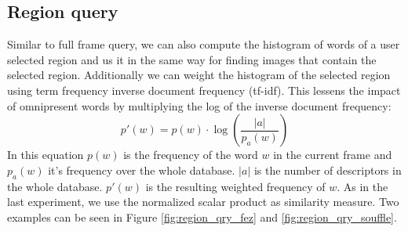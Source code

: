 \documentclass{paper}
\begin{document}
\subsection{Region query}
Similar to full frame query, we can also compute the histogram of words of a user 
selected region and us it in the same way for finding images that contain the 
selected region. Additionally we can weight the histogram of the selected region
using term frequency inverse document frequency (tf-idf). This lessens the impact
of omnipresent words by multiplying the log of the inverse document frequency:
\begin{equation}
	p'(w) = p(w) \cdot \log(\frac{|a|}{p_a(w)})
\end{equation}
In this equation $p(w)$ is the frequency of the word $w$ in the current frame and $p_a(w)$
 it's frequency over the whole database. $|a|$ is the number of descriptors in the 
 whole database. $p'(w)$ is the resulting weighted frequency of $w$.
 As in the last experiment, we use the normalized scalar product as similarity measure.
Two examples can be seen in Figure \ref{fig:region_qry_fez} and \ref{fig:region_qry_souffle}.
\end{document}
